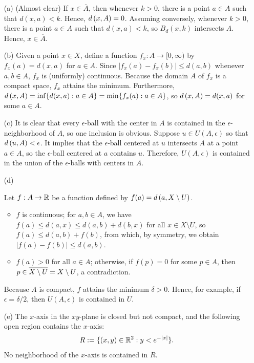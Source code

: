 \begin{sol}
    \begin{enumerate}
        \item[(a)]
        {    
            (Almost clear)
            If $x\in\overline{A}$, then whenever $k>0$, there is a point $a\in A$ such that $d(x, a)<k$.
            Hence, ${d}\left({x},{A}\right)=0$.
            Assuming conversely, whenever $k>0$, there is a point $a\in A$ such that $d(x, a)<k$, so $B_d(x, k)$ intersects $A$.
            Hence, $x\in\overline{A}$.
        }
        \item[(b)]
        {
            Given a point $x\in X$, define a function $f_x: A\rightarrow[0, \infty)$ by $f_x(a)=d(x, a)$ for $a\in A$.
            Since $|f_x(a)-f_x(b)|\leq d(a, b)$ whenever $a, b\in A$, $f_x$ is (uniformly) continuous.
            Because the domain $A$ of $f_x$ is a compact space, $f_x$ attains the minimum.
            Furthermore, ${d}\left({x},{A}\right)=\inf\{d(x, a): a\in A\}=\min\{f_x(a): a\in A\}$, so ${d}\left({x},{A}\right)=d(x, a)$ for some $a\in A$.
        }
        \item[(c)]
        {
            It is clear that every $\epsilon$-ball with the center in $A$ is contained in the $\epsilon$-neighborhood of $A$, so one inclusion is obvious.
            Suppose $u\in U(A, \epsilon)$ so that ${d}\left({u},{A}\right)<\epsilon$.
            It implies that the $\epsilon$-ball centered at $u$ intersects $A$ at a point $a\in A$, so the $\epsilon$-ball centered at $a$ contains $u$.
            Therefore, $U(A, \epsilon)$ is contained in the union of the $\epsilon$-balls with centers in $A$.
        }
        \item[(d)]
        {    
            Let $f: A\rightarrow {\mathbb{R}}$ be a function defined by $f(a)={d}\left({a},{X\setminus U}\right)$.
            \begin{itemize}
                \item
                {
                    $f$ is continuous; for $a, b\in A$, we have $f(a)\leq d(a, x)\leq d(a, b)+d(b, x)$ for all $x\in X\setminus U$, so $f(a)\leq d(a, b)+f(b)$, from which, by symmetry, we obtain $|f(a)-f(b)|\leq d(a, b)$.
                }
                \item
                {
                    $f(a)>0$ for all $a\in A$; otherwise, if $f(p)=0$ for some $p\in A$, then $p\in\overline{X\setminus U}=X\setminus U$, a contradiction.
                }
            \end{itemize}
            Because $A$ is compact, $f$ attains the minimum $\delta>0$.
            Hence, for example, if $\epsilon=\delta/2$, then $U(A, \epsilon)$ is contained in $U$.
        }
        \item[(e)]
        {
            The $x$-axis in the $xy$-plane is closed but not compact, and the following open region contains the $x$-axis:
            \begin{align*}
                R:=\{(x, y)\in{\mathbb{R}}^2: y<e^{-|x|}\}.
            \end{align*}
            No neighborhood of the $x$-axis is contained in $R$.
        }
    \end{enumerate}
\end{sol}

